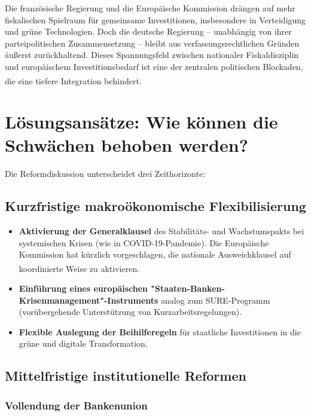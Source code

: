 \documentclass[12pt,a4paper]{article}
\newcommand{\footcite}[1]{\textsuperscript{\cite{#1}}}
\begin{document}
	Die französische Regierung und die Europäische Kommission drängen auf mehr fiskalischen Spielraum für gemeinsame Investitionen, insbesondere in Verteidigung und grüne Technologien. Doch die deutsche Regierung – unabhängig von ihrer parteipolitischen Zusammensetzung – bleibt aus verfassungsrechtlichen Gründen äußerst zurückhaltend. Dieses Spannungsfeld zwischen nationaler Fiskaldisziplin und europäischem Investitionsbedarf ist eine der zentralen politischen Blockaden, die eine tiefere Integration behindert.\footcite{Ifo2018}
	
	\section{Lösungsansätze: Wie können die Schwächen behoben werden?}
	
	Die Reformdiskussion unterscheidet drei Zeithorizonte:
	
	\subsection{Kurzfristige makroökonomische Flexibilisierung}
	
	\begin{itemize}
		\item \textbf{Aktivierung der Generalklausel} des Stabilitäts- und Wachstumspakts bei systemischen Krisen (wie in COVID-19-Pandemie). Die Europäische Kommission hat kürzlich vorgeschlagen, die nationale Ausweichklausel auf koordinierte Weise zu aktivieren.\footcite{Zorell2025}
		\item \textbf{Einführung eines europäischen "Staaten-Banken-Krisenmanagement"-Instruments} analog zum SURE-Programm (vorübergehende Unterstützung von Kurzarbeitsregelungen).
		\item \textbf{Flexible Auslegung der Beihilferegeln} für staatliche Investitionen in die grüne und digitale Transformation.
	\end{itemize}
	
	\subsection{Mittelfristige institutionelle Reformen}
	
	\subsubsection{Vollendung der Bankenunion}
	
\end{document}

